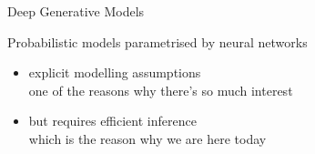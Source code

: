 \documentclass[14pt]{beamer}
\begin{document}
\begin{frame}{Deep Generative Models}

Probabilistic models parametrised by neural networks
\begin{itemize}
	\pause
	\item explicit modelling assumptions\\
	one of the reasons why there's so much interest	
	\pause
	\item but requires efficient inference\\
	\pause
	\alert{which is the reason why we are here today}
\end{itemize}

\end{frame}
\end{document}
